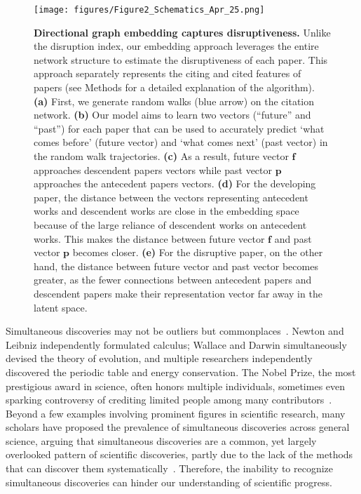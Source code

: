 \documentclass[12pt]{article}
\begin{document}
\begin{figure}
    \centering
\texttt{[image: figures/Figure2\_Schematics\_Apr\_25.png]}
    \caption{\textbf{Directional graph embedding captures disruptiveness.}  Unlike the disruption index, our embedding approach leverages the entire network structure to estimate the disruptiveness of each paper. This approach separately represents the citing and cited features of papers (see Methods for a detailed explanation of the algorithm). \textbf{(a)} First, we generate random walks (blue arrow) on the citation network. \textbf{(b)} Our model aims to learn two vectors (``future'' and ``past'') for each paper that can be used to accurately predict `what comes before' (future vector) and `what comes next' (past vector) in the random walk trajectories. \textbf{(c)} As a result, future vector $\mathbf{f}$ approaches descendent papers vectors while past vector $\mathbf{p}$ approaches the antecedent papers vectors. \textbf{(d)} For the developing paper,  the distance between the vectors representing antecedent works and descendent works are close in the embedding space because of the large reliance of descendent works on antecedent works. This makes the distance between future vector $\mathbf{f}$ and past vector $\mathbf{p}$ becomes closer. \textbf{(e)}  For the disruptive paper, on the other hand, the distance between future vector and past vector becomes greater, as the fewer connections between antecedent papers and descendent papers make their representation vector far away in the latent space.}
    \label{fig:disruptiveschematics}
\end{figure}




Simultaneous discoveries may not be outliers but commonplaces~\cite{merton1961singletons,simonton1979multiple}. Newton and Leibniz independently formulated calculus; Wallace and Darwin simultaneously devised the theory of evolution, and multiple researchers independently discovered the periodic table and energy conservation. The Nobel Prize, the most prestigious award in science, often honors multiple individuals, sometimes even sparking controversy of crediting limited people among many contributors~\cite{merali_physicists_2010}. Beyond a few examples involving prominent figures in scientific research, many scholars have proposed the prevalence of simultaneous discoveries across general science, arguing that simultaneous discoveries are a common, yet largely overlooked pattern of scientific discoveries, partly due to the lack of the methods that can discover them systematically~\cite{simonton1979multiple,merton1961singletons}. Therefore, the inability to recognize simultaneous discoveries can hinder our understanding of scientific progress.
\end{document}
